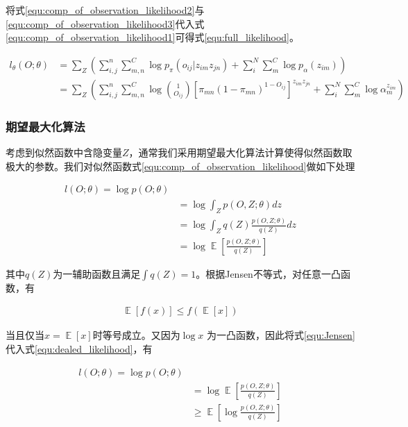 将式\ref{equ:comp_of_observation_likelihood2}与\ref{equ:comp_of_observation_likelihood3}代入式\ref{equ:comp_of_observation_likelihood1}可得式\ref{equ:full_likelihood}。

\begin{equation}\label{equ:full_likelihood}
  \begin{aligned}
l_\theta(O;\theta) &= \sum_Z(\sum_{i,j}^{n}\sum_{m,n}^C\log p_\pi(o_{ij}|z_{im}z_{jn})+\sum_{i}^N\sum_m^C\log p_\alpha(z_
{im}))\\ &=\sum_Z(\sum_{i,j}^{n}\sum_{m,n}^C\log \binom{1}{O_{ij}}[\pi_{mn}(1-\pi_{mn})^{1-O_{ij}}]^{ z_{im}z_{jn}}+\sum_
{i}^N\sum_m^C\log\alpha_m^{z_{im}})
  \end{aligned}
\end{equation}

\subsubsection{期望最大化算法}

考虑到似然函数中含隐变量$Z$，通常我们采用期望最大化算法\cite{dempster_maximum_1977}计算使得似然函数取极大的参数。我们对似然函数式\ref{equ:comp_of_observation_likelihood}做如下处理

\begin{equation}\label{equ:dealed_likelihood}
  \begin{aligned}
    l(O;\theta)=\log p(O;\theta)\\
&=\log \int_Zp(O,Z;\theta)dz\\
&=\log \int_Z q(Z)\frac{p(O,Z;\theta)}{q(Z)}dz\\
&=\log \mathop{\mathbb{E}}[\frac{p(O,Z;\theta)}{q(Z)}]
  \end{aligned}
\end{equation}


其中$q(Z)$为一辅助函数且满足$\int q(Z)=1$。根据Jensen不等式\cite{jensen_sur_1906}，对任意一凸函数，有

\begin{equation}\label{equ:Jensen}
  \begin{aligned}
    \mathop{\mathbb{E}}[f(x)]\leq f(\mathop{\mathbb{E}}[x])
  \end{aligned}
\end{equation}

当且仅当$x=\mathop{\mathbb{E}}[x]$时等号成立。又因为$\log x$ 为一凸函数，因此将式\ref{equ:Jensen}代入式\ref{equ:dealed_likelihood}，有

\begin{equation}\label{equ:jensen_in_likelihood}
  \begin{aligned}
l(O;\theta)=\log p(O;\theta)\\
&=\log \mathop{\mathbb{E}}[\frac{p(O,Z;\theta)}{q(Z)}]\\
&\geq  \mathop{\mathbb{E}}[\log\frac{p(O,Z;\theta)}{q(Z)}]
\end{aligned}\end{equation}

